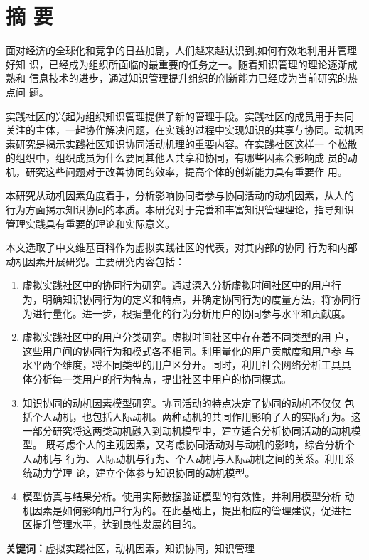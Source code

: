 \documentclass[adobefonts,cs4size,a4paper,openany]{ctexbook}
\begin{document}
\chapter*{摘 \quad 要}

面对经济的全球化和竞争的日益加剧，人们越来越认识到,如何有效地利用并管理好知
识，已经成为组织所面临的最重要的任务之一。随着知识管理的理论逐渐成熟和
信息技术的进步，通过知识管理提升组织的创新能力已经成为当前研究的热点问
题。

实践社区的兴起为组织知识管理提供了新的管理手段。实践社区的成员用于共同
关注的主体，一起协作解决问题，在实践的过程中实现知识的共享与协同。动机因素研究是揭示实践社区知识协同活动机理的重要内容。在实践社区这样一
个松散的组织中，组织成员为什么要同其他人共享和协同，有哪些因素会影响成
员的动机，研究这些问题对于改善协同的效率，提高个体的创新能力具有重要作
用。

本研究从动机因素角度着手，分析影响协同者参与协同活动的动机因素，从人的
行为方面揭示知识协同的本质。本研究对于完善和丰富知识管理理论，指导知识
管理实践具有重要的理论和实际意义。

本文选取了中文维基百科作为虚拟实践社区的代表，对其内部的协同
行为和内部动机因素开展研究。主要研究内容包括：

\begin{enumerate}
\item 虚拟实践社区中的协同行为研究。通过深入分析虚拟时间社区中的用户行
  为，明确知识协同行为的定义和特点，并确定协同行为的度量方法，将协同行
  为进行量化。进一步，根据量化的行为分析用户的协同参与水平和贡献度。
\item 虚拟实践社区中的用户分类研究。虚拟时间社区中存在着不同类型的用
  户，这些用户间的协同行为和模式各不相同。利用量化的用户贡献度和用户参
  与水平两个维度，将不同类型的用户区分开。同时，利用社会网络分析工具具
  体分析每一类用户的行为特点，提出社区中用户的协同模式。
\item 知识协同的动机因素模型研究。协同活动的特点决定了协同的动机不仅仅
包括个人动机，也包括人际动机。两种动机的共同作用影响了人的实际行为。这
一部分研究将这两类动机融入到动机模型中，建立适合分析协同活动的动机模型。
既考虑个人的主观因素，又考虑协同活动对与动机的影响，综合分析个人动机与
行为、人际动机与行为、个人动机与人际动机之间的关系。利用系统动力学理
论，建立个体参与知识协同的动机模型。
\item 模型仿真与结果分析。使用实际数据验证模型的有效性，并利用模型分析
  动机因素是如何影响用户行为的。在此基础上，提出相应的管理建议，促进社
  区提升管理水平，达到良性发展的目的。

\end{enumerate}

\textbf{关键词：}虚拟实践社区，动机因素，知识协同，知识管理
\end{document}
